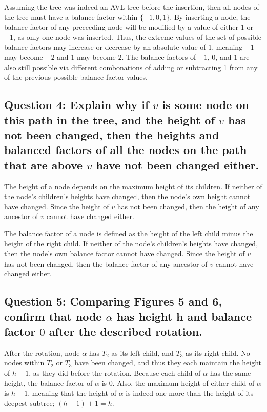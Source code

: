 \documentclass[a4paper, 12pt, titlepage]{article}
\begin{document}
Assuming the tree was indeed an AVL tree before the insertion, 
then all nodes of the tree must have a balance factor within $\{-1, 0, 1\}$. 
By inserting a node, 
the balance factor of any preceeding node will be modified by a value of either $1$ or $-1$, 
as only one node was inserted. 
Thus, 
the extreme values of the set of possible balance factors may increase or decrease by an absolute value of 1, 
meaning $-1$ may become $-2$ and $1$ may become $2$.
The balance factors of $-1$, $0$, and $1$ are also still possible via different combonations of adding or subtracting 1 from any of the previous possible balance factor values.

\subsection*{Question 4: Explain why if $v$ is some node on this path in the tree, and the height of $v$ has not been changed, then the heights and balanced factors of all the nodes on the path that are above $v$ have not been changed either.} 

The height of a node depends on the maximum height of its children. 
If neither of the node's children's heights have changed, 
then the node's own height cannot have changed.
Since the height of $v$ has not been changed,
then the height of any ancestor of $v$ cannot have changed either.

The balance factor of a node is defined as the height of the left child minus the height of the right child. 
If neither of the node's children's heights have changed, 
then the node's own balance factor cannot have changed.
Since the height of $v$ has not been changed,
then the balance factor of any ancestor of $v$ cannot have changed either.

\subsection*{Question 5: Comparing Figures 5 and 6, confirm that node $\alpha$ has height h and balance factor $0$ after the described rotation.} 

After the rotation, 
node $\alpha$ has $T_2$ as its left child, 
and $T_3$ as its right child. 
No nodes within $T_2$ or $T_3$ have been changed, 
and thus they each maintain the height of $h-1$, 
as they did before the rotation. 
Because each child of $\alpha$ has the same height, 
the balance factor of $\alpha$ is $0$. 
Also, 
the maximum height of either child of $\alpha$ is $h-1$, 
meaning that the height of $\alpha$ is indeed one more than the height of its deepest subtree;
$(h-1) + 1 = h$.
\end{document}
